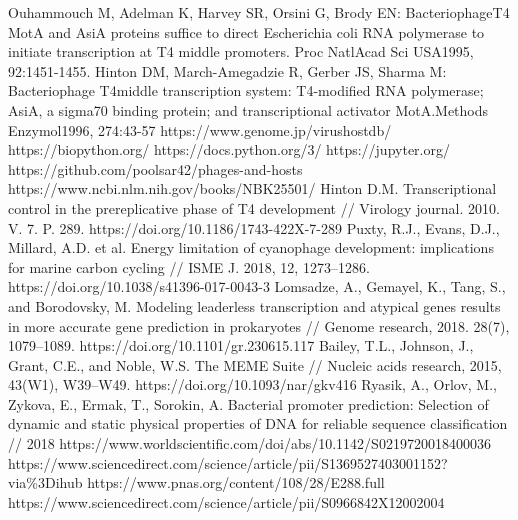 \documentclass[a4paper,12pt]{article}
\begin{document}
\begin{thebibliography}{9}
     Ouhammouch M, Adelman K, Harvey SR, Orsini G, Brody EN: BacteriophageT4 MotA and AsiA proteins suffice to direct Escherichia coli RNA polymerase to initiate transcription at T4 middle promoters. Proc  NatlAcad  Sci  USA1995, 92:1451-1455.
     Hinton DM, March-Amegadzie R, Gerber JS, Sharma M: Bacteriophage T4middle transcription system: T4-modified RNA polymerase; AsiA, a sigma70 binding protein; and transcriptional activator MotA.Methods  Enzymol1996, 274:43-57
     https://www.genome.jp/virushostdb/ 
     https://biopython.org/
     https://docs.python.org/3/
     https://jupyter.org/
     https://github.com/poolsar42/phages-and-hosts
     https://www.ncbi.nlm.nih.gov/books/NBK25501/
     Hinton D.M. Transcriptional control in the prereplicative phase of T4 development // Virology
    journal. 2010. V. 7. P. 289. https://doi.org/10.1186/1743-422X-7-289
     Puxty, R.J., Evans, D.J., Millard, A.D. et al. Energy limitation of cyanophage development:
    implications for marine carbon cycling // ISME J. 2018, 12, 1273–1286. https://doi.org/10.1038/s41396-017-0043-3
     Lomsadze, A., Gemayel, K., Tang, S., and Borodovsky, M. Modeling leaderless transcription and
    atypical genes results in more accurate gene prediction in prokaryotes // Genome research,  2018. 28(7), 1079–1089.
    https://doi.org/10.1101/gr.230615.117
     Bailey, T.L., Johnson, J., Grant, C.E., and Noble, W.S. The MEME Suite // Nucleic acids research,
    2015, 43(W1), W39–W49. https://doi.org/10.1093/nar/gkv416
     Ryasik, A., Orlov, M., Zykova, E., Ermak, T., Sorokin, A. Bacterial promoter prediction: Selection
    of dynamic and static physical properties of DNA for reliable sequence classification // 2018
    https://www.worldscientific.com/doi/abs/10.1142/S0219720018400036
     https://www.sciencedirect.com/science/article/pii/S1369527403001152?via\%3Dihub
     https://www.pnas.org/content/108/28/E288.full
     https://www.sciencedirect.com/science/article/pii/S0966842X12002004
    
    
\end{thebibliography}
\end{document}
